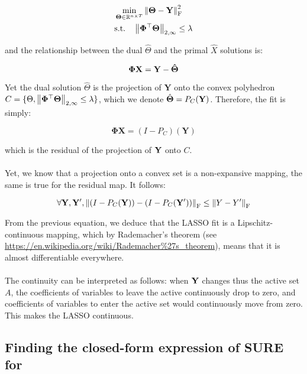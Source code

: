 \documentclass[a4paper,10pt]{article}
\theoremstyle{definition}
\begin{document}
\begin{align*}
    &\min_{\mathbf{\Theta} \in \mathbb{R}^{n \times T}} \left \lVert  \mathbf{\Theta} - \mathbf{Y}  \right \rVert_{\text{F}}^2 \\
    &\text{s.t.} \quad \left \lVert \mathbf{\Phi^{\top}\Theta} \right \rVert_{2, \infty} \leq \lambda
\end{align*}

and the relationship between the dual $\hat{\Theta}$ and the primal $\hat{X}$ solutions is:

\begin{equation*}
    \bf{\Phi X} = \mathbf{Y - \hat{\Theta}}
\end{equation*}

Yet the dual solution $\hat{\Theta}$ is the projection of $\mathbf{Y}$ onto the convex polyhedron $C = \{\Theta, \left \lVert \mathbf{\Phi^{\top}\Theta} \right \rVert_{2, \infty} \leq \lambda\}$,
which we denote $\hat{\bf{\Theta}} = P_C(\bf{Y})$. Therefore, the  fit is simply:

\begin{equation*}
    \mathbf{\Phi X} = (I - P_C)(\mathbf{Y})
\end{equation*}

which is the residual of the projection of $\mathbf{Y}$ onto $C$.
\\
\\
Yet, we know that a projection onto a convex set is a non-expansive mapping, the same is true for the residual map. It follows:

\begin{equation*}
    \forall \mathbf{Y}, \mathbf{Y'}, \left \lVert (I - P_C(\mathbf{Y})) - (I - P_C(\mathbf{Y'})) \right \rVert_{\text{F}} \leq \left \lVert Y - Y' \right \rVert_{\text{F}}
\end{equation*}

From the previous equation, we deduce that the LASSO fit is a Lipschitz-continuous mapping, which by Rademacher's theorem
(see \url{https://en.wikipedia.org/wiki/Rademacher%27s_theorem}), means that it is almost differentiable everywhere.
\\
\\
The continuity can be interpreted as follows: when $\mathbf{Y}$ changes thus the active set $A$, the coefficients of variables to leave
the active continuously drop to zero, and coefficients of variables to enter the active set would continuously move from zero. This makes the LASSO continuous.


\subsection*{Finding the closed-form expression of SURE for }


\newpage


\end{document}
